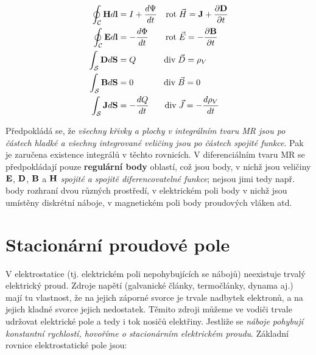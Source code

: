 {      \begin{align}
        \oint_\mathcal{C}\mathbf{H} d\mathbf{l} &= I+\frac{d \Psi}{d t}
                                           \quad \mathrm{rot}\;\vec{H}=\mathbf{J}+\frac{\partial \mathbf{D}}{\partial t}             \\
        \oint_\mathcal{C}\mathbf{E} d\mathbf{l} &= -\frac{d \Phi}{d t}
                               \qquad \mathrm{rot}\;\vec{E}=-\frac{\partial \mathbf{B}}{\partial t}\\
         \int_\mathcal{S}\mathbf{D} d\mathbf{S} &= Q \qquad\quad\;   \mathrm{div}\;\vec{D}=\rho_V                \\
         \int_\mathcal{S}\mathbf{B} d\mathbf{S} &= 0 \qquad\quad\;\; \mathrm{div}\;\vec{B}=0                     \\
         \int_\mathcal{S}\mathbf{J} d\mathbf{S} &= -\frac{d Q}{d t} \quad\;\;\;\mathrm{div}\;\vec{J}=-\frac{d \rho_V}{d t}
      \end{align}

      Předpokládá se, že \emph{všechny křivky a plochy v integrálním tvaru MR jsou po částech
      hladké a všechny integrované veličiny jsou po částech spojité funkce}. Pak je zaručena
      existence integrálů v těchto rovnicích. V diferenciálním tvaru MR se předpokládají pouze
      \textbf{regulární body} oblastí, což jsou body, v nichž jsou veličiny $\mathbf{E}$, $\mathbf{D}$,
      $\mathbf{B}$ a $\mathbf{H}$ \emph{spojité a spojitě diferencovatelné funkce}; nejsou jimi tedy např.
      body rozhraní dvou různých prostředí, v elektrickém poli body v nichž jsou umístěny diskrétní
      náboje, v magnetickém poli body proudových vláken atd.

  \section{Stacionární proudové pole}
    V elektrostatice (tj. elektrickém poli nepohybujících se nábojů) neexistuje trvalý elektrický
    proud. Zdroje napětí (galvanické články, termočlánky, dynama aj.) mají tu vlastnost, že na
    jejich záporné svorce je trvale nadbytek elektronů, a na jejich kladné svorce jejich
    nedostatek. Těmito zdroji můžeme ve vodiči trvale udržovat elektrické pole a tedy i tok nosičů
    elektřiny. Jestliže se \emph{náboje pohybují konstantní rychlostí, hovoříme o stacionárním
    elektrickém proudu}. Základní rovnice elektrostatické pole jsou:

}
